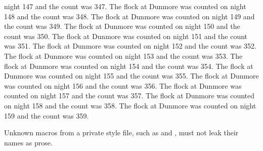 night 147 and the count was 347. The flock at Dunmore was counted on night 148 and the count was 348. The flock at Dunmore was counted on night 149 and the count was 349. The flock at Dunmore was counted on night 150 and the count was 350. The flock at Dunmore was counted on night 151 and the count was 351. The flock at Dunmore was counted on night 152 and the count was 352. The flock at Dunmore was counted on night 153 and the count was 353. The flock at Dunmore was counted on night 154 and the count was 354. The flock at Dunmore was counted on night 155 and the count was 355. The flock at Dunmore was counted on night 156 and the count was 356. The flock at Dunmore was counted on night 157 and the count was 357. The flock at Dunmore was counted on night 158 and the count was 358. The flock at Dunmore was counted on night 159 and the count was 359.

Unknown macros from a private style file, such as \projectname{} and , must not leak their names as prose.